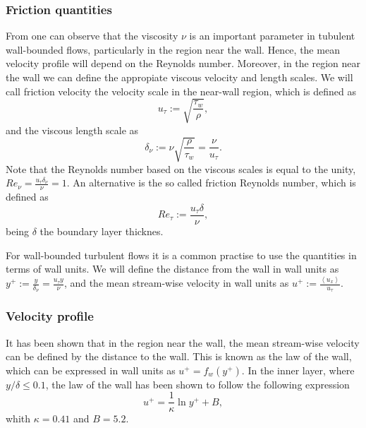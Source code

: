 \subsubsection{Friction quantities}
From  one can observe that the viscosity $ \nu $ is an important parameter in tubulent wall-bounded flows, particularly in the region near the wall. Hence, the mean velocity profile  will depend on the Reynolds number. Moreover, in the region near the wall we can define the appropiate viscous velocity and length scales. We will call friction velocity the velocity scale in the near-wall region, which is defined as
\begin{equation}
\label{eq-friction_velocity}
u_\tau:=\sqrt{\frac{\tau_w}{\rho}},
\end{equation}
and the viscous length scale as 
\begin{equation}
\label{eq-viscous_lenghtscale}
\delta_\nu:=\nu\sqrt{\frac{\rho}{\tau_w}}=\frac{\nu}{u_\tau}.
\end{equation}
Note that the Reynolds number based on the viscous scales is equal to the unity, $ Re_\nu = \frac{u_\tau\delta_\nu}{\nu}=1 $. An alternative is the so called friction Reynolds number, which is defined as
\begin{equation}
\label{eq-friction_reynolds}
Re_\tau:=\frac{u_\tau\delta}{\nu},
\end{equation}
being $ \delta $ the boundary layer thicknes. 

For wall-bounded turbulent flows it is a common practise to use the quantities in terms of wall units. We will define the distance from the wall in wall units as $ y^+:=\frac{y}{\delta_\nu}=\frac{u_\tau y}{\nu} $, and the mean stream-wise velocity in wall units as $ u^+:=\frac{\left\langle u_x\right\rangle}{u_\tau} $.

\subsubsection{Velocity profile}
It has been shown that in the region near the wall, the mean stream-wise velocity can be defined by the distance to the wall. This is known as the law of the wall, which can be expressed in wall units as $ u^+=f_w(y^+) $. In the inner layer, where $ y/\delta\le0.1 $, the law of the wall has been shown to follow the following expression
\begin{equation}
\label{eq-wall_law}
u^+=\frac{1}{\kappa}\ln y^++B,
\end{equation}
whith $ \kappa=0.41 $ and $ B=5.2 $.


